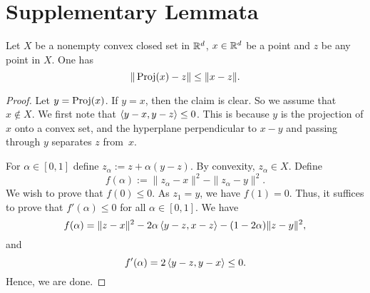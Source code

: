 \chapter{Supplementary Lemmata}
\begin{lemma}\label{lem:projection}
    Let $X$ be a nonempty convex closed set in $\mathbb{R}^d$, $x\in \mathbb{R}^d$ be a point and $z$ be any point in $X$. One has
    \[
        \| \operatorname{Proj}(x) - z \| \leq \|x - z\|.
    \]
\end{lemma}
\begin{proof}
    Let $y = \operatorname{Proj}(x)$. If $y=x$, then the claim is clear. So we assume that $x\not\in X$. We first note that $\left\langle y-x,y-z \right\rangle \leq 0$. This is because $y$ is the projection of $x$ onto a convex set, and the hyperplane perpendicular to $x-y$ and passing through $y$ separates $z$ from~$x$.

    For $\alpha \in [0,1]$ define $z_\alpha := z + \alpha(y-z)$. By convexity, $z_\alpha \in X$. Define
    \[
        f(\alpha) := \|z_\alpha - x\|^2 - \|z_\alpha - y\|^2. 
    \]
    We wish to prove that $f(0) \leq 0$.  As $z_1 = y$, we have $f(1) = 0$. Thus, it suffices to prove that $f'(\alpha) \leq 0$ for all $\alpha\in[0,1]$. We have
    \[
        f(\alpha) = \|z-x\|^2 - 2\alpha\left\langle y-z,x-z \right\rangle - (1-2\alpha)\|z-y\|^2,
    \]
    and
    \[
        f'(\alpha) = 2\left\langle y-z,y-x \right\rangle \leq 0.
    \]
    Hence, we are done.
\end{proof}

